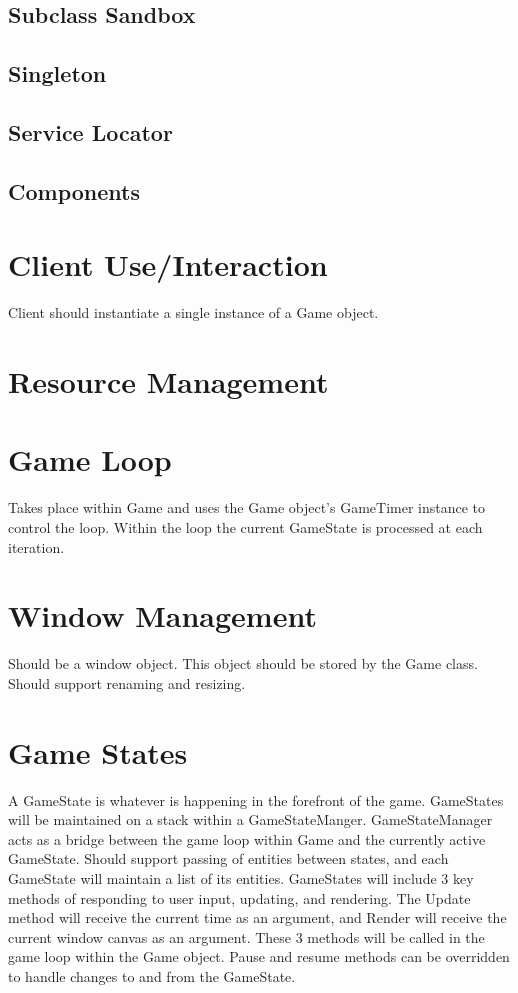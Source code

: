 \documentclass[12pt]{article}
\begin{document}
\subsection{Subclass Sandbox}
\subsection{Singleton}
\subsection{Service Locator}
\subsection{Components}

\section{	Client Use/Interaction}
Client should instantiate a single instance of a Game object.  

\section{ Resource Management}

\section{ Game Loop}
Takes place within Game and uses the Game object's GameTimer instance to control the loop.  Within the loop the current GameState is processed at each iteration.
		
\section{Window Management}
Should be a window object.  This object should be stored by the Game class.  Should support renaming and resizing.  
	
\section{	Game States}
A GameState is whatever is happening in the forefront of the game.  GameStates will be maintained on a stack within a GameStateManger.  GameStateManager acts as a bridge between the game loop within Game and the currently active GameState.  Should support passing of entities between states, and each GameState will maintain a list of its entities.  GameStates will include 3 key methods of responding to user input, updating, and rendering.  The Update method will receive the current time as an argument, and Render will receive the current window canvas as an argument.  These 3 methods will be called in the game loop within the Game object.  Pause and resume methods can be overridden to handle changes to and from the GameState.
\end{document}
